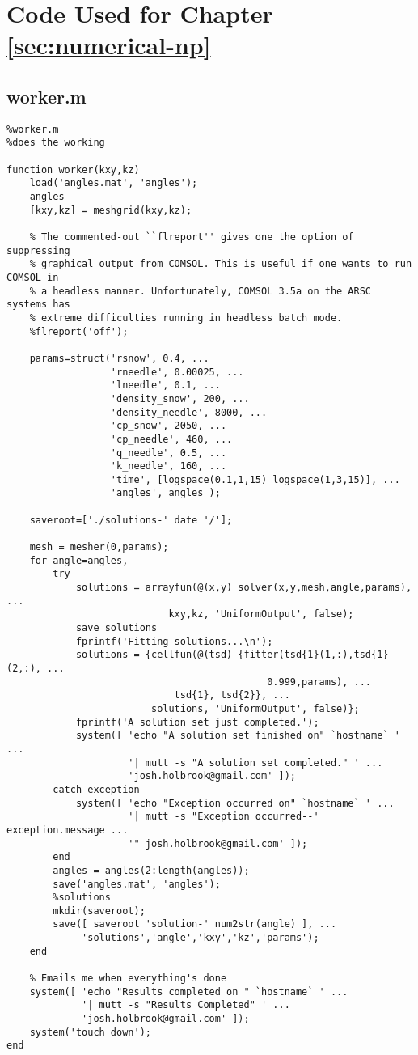 \chapter{Code Used for Chapter \ref{sec:numerical-np}}
\label{apx:numerical-np}

\section{worker.m}
\small
\begin{verbatim}
%worker.m
%does the working

function worker(kxy,kz)
    load('angles.mat', 'angles');
    angles
    [kxy,kz] = meshgrid(kxy,kz);

    % The commented-out ``flreport'' gives one the option of suppressing
    % graphical output from COMSOL. This is useful if one wants to run COMSOL in
    % a headless manner. Unfortunately, COMSOL 3.5a on the ARSC systems has
    % extreme difficulties running in headless batch mode.
    %flreport('off');

    params=struct('rsnow', 0.4, ...
                  'rneedle', 0.00025, ...
                  'lneedle', 0.1, ...
                  'density_snow', 200, ...
                  'density_needle', 8000, ...
                  'cp_snow', 2050, ...
                  'cp_needle', 460, ...
                  'q_needle', 0.5, ...
                  'k_needle', 160, ...
                  'time', [logspace(0.1,1,15) logspace(1,3,15)], ...
                  'angles', angles );

    saveroot=['./solutions-' date '/'];

    mesh = mesher(0,params);
    for angle=angles,
        try
            solutions = arrayfun(@(x,y) solver(x,y,mesh,angle,params), ...
                            kxy,kz, 'UniformOutput', false);
            save solutions
            fprintf('Fitting solutions...\n');
            solutions = {cellfun(@(tsd) {fitter(tsd{1}(1,:),tsd{1}(2,:), ...
                                             0.999,params), ...
                             tsd{1}, tsd{2}}, ...
                         solutions, 'UniformOutput', false)};
            fprintf('A solution set just completed.');
            system([ 'echo "A solution set finished on" `hostname` ' ...
                     '| mutt -s "A solution set completed." ' ...
                     'josh.holbrook@gmail.com' ]);
        catch exception
            system([ 'echo "Exception occurred on" `hostname` ' ...
                     '| mutt -s "Exception occurred--' exception.message ...
                     '" josh.holbrook@gmail.com' ]);
        end
        angles = angles(2:length(angles));
        save('angles.mat', 'angles');
        %solutions
        mkdir(saveroot);
        save([ saveroot 'solution-' num2str(angle) ], ...
             'solutions','angle','kxy','kz','params');
    end

    % Emails me when everything's done
    system([ 'echo "Results completed on " `hostname` ' ...
             '| mutt -s "Results Completed" ' ...
             'josh.holbrook@gmail.com' ]);
    system('touch down');
end
\end{verbatim}
\normalsize


